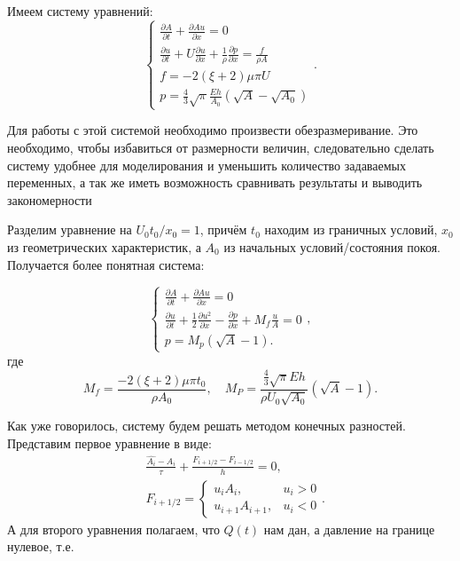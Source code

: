 Имеем систему уравнений:
\begin{equation}
    \label{sys_of_eq}
    \begin{cases}
        \frac{\partial A}{\partial t}+\frac{\partial Au}{\partial x}=0\\
        \frac{\partial u}{\partial t}+U\frac{\partial u}{\partial x}+\frac{1}{\rho}\frac{\partial p}{\partial x}=\frac{f}{\rho A}\\
        f=-2(\xi+2)\mu\pi U\\
        p=\frac{4}{3}\sqrt{\pi}\frac{Eh}{A_0}(\sqrt{A}-\sqrt{A_0})
    \end{cases}.
\end{equation}

Для работы с этой системой необходимо произвести обезразмеривание. Это необходимо, чтобы избавиться от размерности величин,
следовательно сделать систему удобнее для моделирования и уменьшить количество задаваемых переменных, 
а так же иметь возможность сравнивать результаты и выводить закономерности

Разделим уравнение на ${U_0 t_0}/{x_0}=1$,  причём $t_0$ находим из граничных условий, 
$x_0$ из геометрических характеристик, а $A_0$ из начальных условий/состояния покоя. Получается более понятная система:

\begin{equation}
    \label{sys_of_eq1}
    \begin{cases}
        \frac{\partial A}{\partial t}+\frac{\partial Au}{\partial x}=0\\
        \frac{\partial u}{\partial t}+\frac{1}{2}\frac{\partial u^2}{\partial x}-\frac{\partial p}{\partial x}+M_f \frac{u}{A}=0\\
        p=M_p(\sqrt{A}-1).
    \end{cases},
    \end{equation}
где 
$$ M_f=\frac{-2(\xi+2)\mu \pi t_0}{\rho A_0},\quad  M_P=\frac{\frac{4}{3}\sqrt{\pi}Eh}{\rho U_0\sqrt{A_0}}(\sqrt{A}-1).$$



Как уже говорилось, систему будем решать методом конечных разностей. Представим первое уравнение в виде:
$$
\begin{aligned}
    &\frac{\hat{A_i}-A_i}{\tau}+\frac{F_{i+1/2}-F_{i-1/2}}{h}=0,\\
    &F_{i+1/2}=\begin{cases}
        u_i A_i, &u_i>0\\
        u_{i+1}A_{i+1},& u_i<0
    \end{cases}.
\end{aligned}
$$
А для второго уравнения полагаем, что $Q(t)$ нам дан, а давление на границе нулевое, т.е. 

